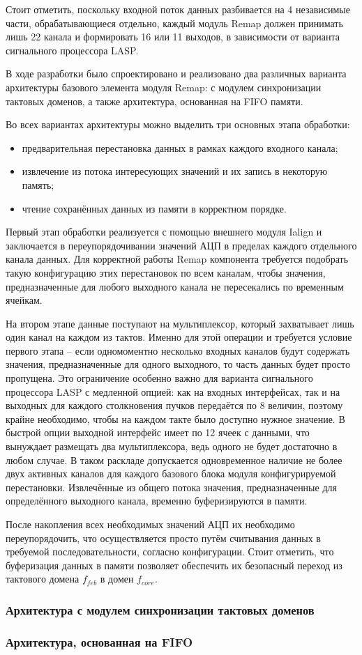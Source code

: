 Стоит отметить, поскольку входной поток данных разбивается на 4 независимые части, обрабатывающиеся отдельно, каждый модуль Remap должен принимать лишь 22 канала и формировать 16 или 11 выходов, в зависимости от варианта сигнального процессора LASP.\par
В ходе разработки было спроектировано и реализовано два различных варианта архитектуры базового элемента модуля Remap: с модулем синхронизации тактовых доменов, а также архитектура, основанная на FIFO памяти.\par
Во всех вариантах архитектуры можно выделить три основных этапа обработки:\par
\begin{itemize}
    \item предварительная перестановка данных в рамках каждого входного канала;
    \item извлечение из потока интересующих значений и их запись в некоторую память;
    \item чтение сохранённых данных из памяти в корректном порядке.
\end{itemize}\par
Первый этап обработки реализуется с помощью внешнего модуля Ialign и заключается в переупорядочивании значений АЦП в пределах каждого отдельного канала данных. Для корректной работы Remap компонента требуется подобрать такую конфигурацию этих перестановок по всем каналам, чтобы значения, предназначенные для любого выходного канала не пересекались по временным ячейкам.\par
На втором этапе данные поступают на мультиплексор, который захватывает лишь один канал на каждом из тактов. Именно для этой операции и требуется условие первого этапа -- если одномоментно несколько входных каналов будут содержать значения, предназначенные для одного выходного, то часть данных будет просто пропущена. Это ограничение особенно важно для варианта сигнального процессора LASP с медленной опцией: как на входных интерфейсах, так и на выходных для каждого столкновения пучков передаётся по 8 величин, поэтому крайне необходимо, чтобы на каждом такте было доступно нужное значение. В быстрой опции выходной интерфейс имеет по 12 ячеек с данными, что вынуждает размещать два мультиплексора, ведь одного не будет достаточно в любом случае. В таком раскладе допускается одновременное наличие не более двух активных каналов для каждого базового блока модуля конфигурируемой перестановки. Извлечённые из общего потока значения, предназначенные для определённого выходного канала, временно буферизируются в памяти.\par
После накопления всех необходимых значений АЦП их необходимо переупорядочить, что осуществляется просто путём считывания данных в требуемой последовательности, согласно конфигурации. Стоит отметить, что буферизация данных в памяти позволяет обеспечить их безопасный переход из тактового домена $f_{feb}$ в домен $f_{core}$.\par

\subsubsection{Архитектура с модулем синхронизации тактовых доменов}


\subsubsection{Архитектура, основанная на FIFO}

